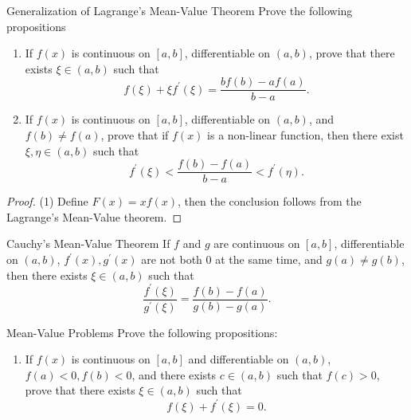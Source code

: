 \begin{example}{Generalization of Lagrange's Mean-Value Theorem}{}
  Prove the following propositions
  \begin{enumerate}
  \item If $f(x)$ is continuous on $[a, b]$, differentiable on $(a, b)$, prove
    that there exists $\xi \in (a, b)$ such that
    \begin{equation}
      f(\xi) + \xi f^{\prime}(\xi) = \frac{b f(b) - a f(a)}{b - a}.
    \end{equation}
  \item If $f(x)$ is continuous on $[a, b]$, differentiable on $(a, b)$, and
    $f(b) \neq f(a)$, prove that if $f(x)$ is a non-linear function, then there exist
    $\xi, \eta \in (a, b)$ such that
    \begin{equation}
      f^{\prime}(\xi) < \frac{f(b) - f(a)}{b - a} < f^{\prime}(\eta).
    \end{equation}
  \end{enumerate}
\end{example}

\begin{proof}
  (1) Define $F(x) = xf(x)$, then the conclusion follows from the Lagrange's
  Mean-Value theorem.
\end{proof}

\begin{theorem}{Cauchy's Mean-Value Theorem}{}
  If $f$ and $g$ are continuous on $[a, b]$,
  differentiable on $(a, b)$,
  $f^{\prime}(x), g^{\prime}(x)$ are not both $0$ at the same time,
  and $g(a) \neq g(b)$, then there exists $\xi \in (a, b)$ such that
  \begin{equation}
    \frac{f^{\prime}(\xi)}{g^{\prime}(\xi)} = \frac{f(b) - f(a)}{g(b) - g(a)}.
  \end{equation}
\end{theorem}

\begin{example}{Mean-Value Problems}{}
  Prove the following propositions:
  \begin{enumerate}
  \item If $f(x)$ is continuous on $[a, b]$ and differentiable on $(a, b)$,
    $f(a) < 0, f(b) < 0$, and there exists $c \in (a, b)$ such that $f(c) > 0$,
    prove that there exists $\xi \in (a, b)$ such that
    \begin{equation}
      f(\xi) + f^{\prime}(\xi) = 0.
    \end{equation}
  \end{enumerate}
\end{example}

